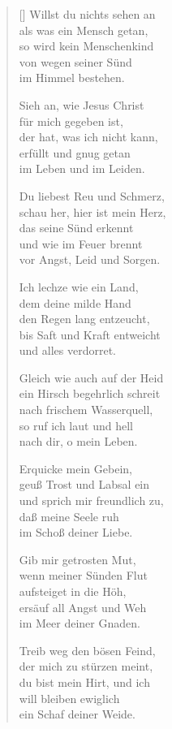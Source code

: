\begin{multicols}{2}
\begin{verse}[\versewidth]
 Willst du nichts sehen an\\
als was ein Mensch getan,\\
so wird kein Menschenkind\\
von wegen seiner Sünd\\
im Himmel bestehen.

 Sieh an, wie Jesus Christ\\
für mich gegeben ist,\\
der hat, was ich nicht kann,\\
erfüllt und gnug getan\\
im Leben und im Leiden.

 Du liebest Reu und Schmerz,\\
schau her, hier ist mein Herz,\\
das seine Sünd erkennt\\
und wie im Feuer brennt\\
vor Angst, Leid und Sorgen.

 Ich lechze wie ein Land,\\
dem deine milde Hand\\
den Regen lang entzeucht,\\
bis Saft und Kraft entweicht\\
und alles verdorret.

 Gleich wie auch auf der Heid\\
ein Hirsch begehrlich schreit\\
nach frischem Wasserquell,\\
so ruf ich laut und hell\\
nach dir, o mein Leben.

 Erquicke mein Gebein,\\
geuß Trost und Labsal ein\\
und sprich mir freundlich zu,\\
daß meine Seele ruh\\
im Schoß deiner Liebe.

 Gib mir getrosten Mut,\\
wenn meiner Sünden Flut\\
aufsteiget in die Höh,\\
ersäuf all Angst und Weh\\
im Meer deiner Gnaden.

 Treib weg den bösen Feind,\\
der mich zu stürzen meint,\\
du bist mein Hirt, und ich\\
will bleiben ewiglich\\
ein Schaf deiner Weide.


\end{verse}
\end{multicols}
